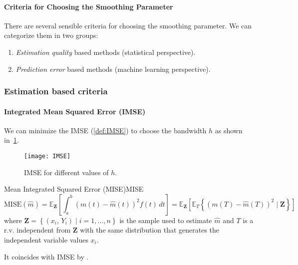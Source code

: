 \paragraph{Criteria for Choosing the Smoothing Parameter}
There are several sensible criteria for choosing the smoothing parameter. We can
categorize them in two groups:
\begin{enumerate}
	\item \emph{Estimation quality} based methods (statistical perspective).
	\item \emph{Prediction error} based methods (machine learning perspective).
\end{enumerate}

\subsubsection{Estimation based criteria}

\paragraph{Integrated Mean Squared Error (IMSE)} We can minimize the
IMSE (\ref{def:IMSE}) to choose the bandwidth $h$ as shown in~\cref{fig:IMSE}.
\begin{figure}[H]
	\texttt{[image: IMSE]}
	\caption{IMSE for different values of $h$.}%
	\label{fig:IMSE}
\end{figure}

\begin{definition}{Mean Integrated Squared Error (MISE)}{MISE}
	\begin{equation*}
		\text{MISE}(\hat m) = \mathds{E}_{\boldsymbol Z} \left[
			\int_a^b \left( m(t) - \hat m(t) \right)^2 f(t) \, dt
			\right] =
		\mathds{E}_{\boldsymbol Z} \left[
			\mathds{E}_T \left\{
			\left( m(T) - \hat m(T) \right)^2 \mid \boldsymbol Z
			\right\}
			\right]
	\end{equation*}
	where $\boldsymbol Z = \left\{(x_i,\, Y_i) \mid i = 1,\ldots,n\right\}$ is the sample
	used to estimate $\hat m$ and $T$ is a r.v. independent from $\boldsymbol Z$
	with the same distribution that generates the independent variable values $x_i$.
	\tcblower
	\begin{note}
		It coincides with IMSE by .
	\end{note}
\end{definition}

